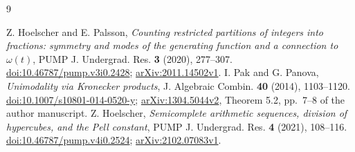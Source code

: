 \documentclass[11pt]{article}
\begin{document}
\begin{thebibliography}{9}
\raggedright
{} Z. Hoelscher and E. Palsson,
\emph{Counting restricted partitions of integers into fractions: symmetry
and modes of the generating function and a connection to $\omega(t)$},
PUMP J. Undergrad. Res. \textbf{3} (2020), 277--307.
\href{https://doi.org/10.46787/pump.v3i0.2428}{doi:10.46787/pump.v3i0.2428};
\href{https://arxiv.org/abs/2011.14502v1}{arXiv:2011.14502v1}.
 I. Pak and G. Panova,
\emph{Unimodality via Kronecker products},
J. Algebraic Combin. \textbf{40} (2014), 1103--1120.
\href{https://doi.org/10.1007/s10801-014-0520-y}{doi:10.1007/s10801-014-0520-y};
\href{https://arxiv.org/abs/1304.5044v2}{arXiv:1304.5044v2},
Theorem 5.2, pp.~7--8 of the author manuscript.
 Z. Hoelscher,
\emph{Semicomplete arithmetic sequences, division of hypercubes,
and the Pell constant}, PUMP J. Undergrad. Res. \textbf{4} (2021), 108--116.
\href{https://doi.org/10.46787/pump.v4i0.2524}{doi:10.46787/pump.v4i0.2524};
\href{https://arxiv.org/abs/2102.07083v1}{arXiv:2102.07083v1}.
\end{thebibliography}
\end{document}
